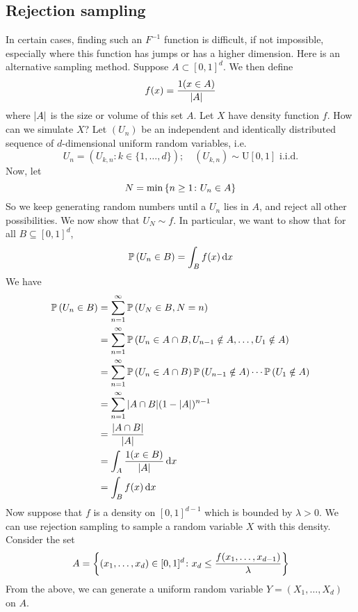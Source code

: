 \subsection{Rejection sampling}
In certain cases, finding such an \(F^{-1}\) function is difficult, if not impossible, especially where this function has jumps or has a higher dimension.
Here is an alternative sampling method.
Suppose \(A \subset [0, 1]^d\).
We then define
\[
	f(x) = \frac{1(x \in A)}{\abs{A}}
\]
where \(\abs{A}\) is the size or volume of this set \(A\).
Let \(X\) have density function \(f\).
How can we simulate \(X\)?
Let \((U_n)\) be an independent and identically distributed sequence of \(d\)-dimensional uniform random variables, i.e.
\[
	U_n = (U_{k, n} \colon k \in \{ 1, \dots, d \});\quad (U_{k, n}) \sim \mathrm{U}[0, 1] \text{ i.i.d.}
\]
Now, let
\[
	N = \min\qty{n \geq 1 \colon U_n \in A}
\]
So we keep generating random numbers until a \(U_n\) lies in \(A\), and reject all other possibilities.
We now show that \(U_N \sim f\).
In particular, we want to show that for all \(B \subseteq [0, 1]^d\),
\[
	\mathbb{P}\left({U_n \in B}\right) = \int_B f(x) \dd{x}
\]
We have
\begin{align*}
	\mathbb{P}\left({U_n \in B}\right) & = \sum_{n=1}^\infty \mathbb{P}\left({U_N \in B, N = n}\right)                                                    \\
	                 & = \sum_{n=1}^\infty \mathbb{P}\left({U_n \in A \cap B, U_{n-1} \notin A, \dots, U_1 \notin A}\right)             \\
	                 & = \sum_{n=1}^\infty \mathbb{P}\left({U_n \in A \cap B}\right) \mathbb{P}\left({U_{n-1} \notin A}\right) \cdots \mathbb{P}\left({U_1 \notin A}\right) \\
	                 & = \sum_{n=1}^\infty \abs{A \cap B} (1 -\abs{A})^{n-1}                                          \\
	                 & = \frac{\abs{A \cap B}}{\abs{A}}                                                               \\
	                 & = \int_A \frac{1(x \in B)}{\abs{A}} \dd{x}                                                     \\
	                 & = \int_B f(x) \dd{x}
\end{align*}
Now suppose that \(f\) is a density on \([0, 1]^{d-1}\) which is bounded by \(\lambda > 0\).
We can use rejection sampling to sample a random variable \(X\) with this density.
Consider the set
\[
	A = \qty{(x_1, \dots, x_d) \in [0, 1]^d \colon x_d \leq \frac{f(x_1, \dots, x_{d-1})}{\lambda}}
\]
From the above, we can generate a uniform random variable \(Y = (X_1, \dots, X_d)\) on \(A\).
